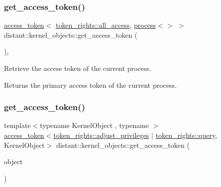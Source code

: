 \subsubsection{\texorpdfstring{get\+\_\+access\+\_\+token()}{get\_access\_token()}\hspace{0.1cm}{\footnotesize\ttfamily [3/4]}}
{\footnotesize\ttfamily \mbox{\hyperlink{classdistant_1_1kernel__objects_1_1access__token}{access\+\_\+token}}$<$ \mbox{\hyperlink{structdistant_1_1access__rights_a6b4d9e837868c8c15cf407e4c80d7f3ca87233263ddd52f3e3067eafc32d3b7a6}{token\+\_\+rights\+::all\+\_\+access}}, \mbox{\hyperlink{classdistant_1_1kernel__objects_1_1process}{process}}$<$$>$ $>$ distant\+::kernel\+\_\+objects\+::get\+\_\+access\+\_\+token (\begin{DoxyParamCaption}{ }\end{DoxyParamCaption})\hspace{0.3cm}{\ttfamily [inline]}, {\ttfamily [noexcept]}}



Retrieve the access token of the current process. 

\begin{DoxyReturn}{Returns}
the primary access token of the current process. 
\end{DoxyReturn}
\mbox{\label{namespacedistant_1_1kernel__objects_a5ca2dd66f4f6f35a0879195cfffce9c2}} 
\subsubsection{\texorpdfstring{get\+\_\+access\+\_\+token()}{get\_access\_token()}\hspace{0.1cm}{\footnotesize\ttfamily [4/4]}}
{\footnotesize\ttfamily template$<$typename Kernel\+Object , typename $>$ \\
\mbox{\hyperlink{classdistant_1_1kernel__objects_1_1access__token}{access\+\_\+token}}$<$\mbox{\hyperlink{structdistant_1_1access__rights_a6b4d9e837868c8c15cf407e4c80d7f3ca59c6fe46f212dd4d2514e1777e707c98}{token\+\_\+rights\+::adjust\+\_\+privileges}} $\vert$ \mbox{\hyperlink{structdistant_1_1access__rights_a6b4d9e837868c8c15cf407e4c80d7f3ca1b1cc7f086b3f074da452bc3129981eb}{token\+\_\+rights\+::query}}, Kernel\+Object$>$ distant\+::kernel\+\_\+objects\+::get\+\_\+access\+\_\+token (\begin{DoxyParamCaption}\item[{const Kernel\+Object \&}]{object }\end{DoxyParamCaption})\hspace{0.3cm}{\ttfamily [noexcept]}}



